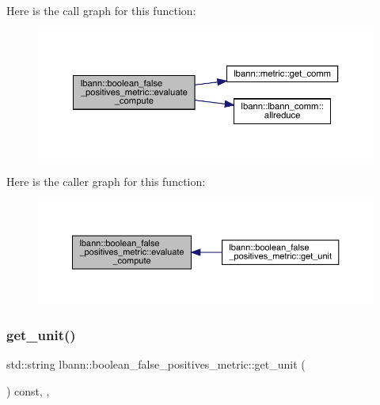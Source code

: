 Here is the call graph for this function\+:\nopagebreak
\begin{figure}[H]
\begin{center}
\leavevmode
\includegraphics[width=350pt]{classlbann_1_1boolean__false__positives__metric_abb6573a4e32e97316c69ce9fc24214f0_cgraph}
\end{center}
\end{figure}
Here is the caller graph for this function\+:\nopagebreak
\begin{figure}[H]
\begin{center}
\leavevmode
\includegraphics[width=350pt]{classlbann_1_1boolean__false__positives__metric_abb6573a4e32e97316c69ce9fc24214f0_icgraph}
\end{center}
\end{figure}
\mbox{\label{classlbann_1_1boolean__false__positives__metric_ab42b53134f128d26e3df37ca7a3d4cea}} 
\subsubsection{\texorpdfstring{get\+\_\+unit()}{get\_unit()}}
{\footnotesize\ttfamily std\+::string lbann\+::boolean\+\_\+false\+\_\+positives\+\_\+metric\+::get\+\_\+unit (\begin{DoxyParamCaption}{ }\end{DoxyParamCaption}) const\hspace{0.3cm}{\ttfamily [inline]}, {\ttfamily [override]}, {\ttfamily [virtual]}}

